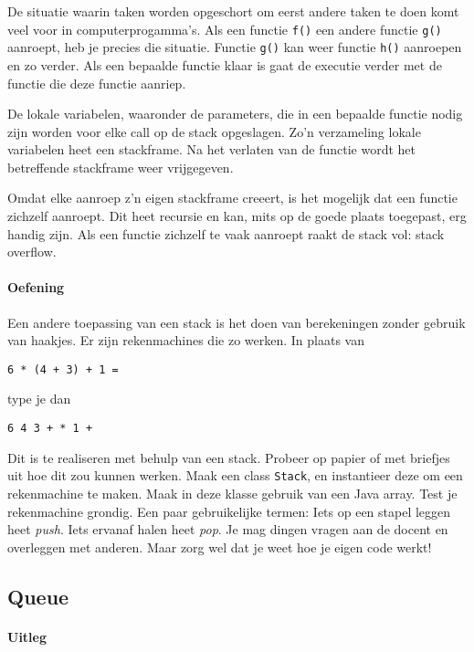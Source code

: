 \documentclass[a4paper,10pt]{article}
\newcommand{\code}[1]{\texttt{#1}}
\begin{document}
De situatie waarin taken worden opgeschort om eerst andere taken te doen komt veel voor in computerprogamma's.
Als een functie \code{f()} een andere functie \code{g()} aanroept, heb je precies die situatie.
Functie \code{g()} kan weer functie \code{h()} aanroepen en zo verder.
Als een bepaalde functie klaar is gaat de executie verder met de functie die deze functie aanriep.

De lokale variabelen, waaronder de parameters, die in een bepaalde functie nodig zijn worden voor elke call op de stack opgeslagen.
Zo'n verzameling lokale variabelen heet een stackframe.
Na het verlaten van de functie wordt het betreffende stackframe weer vrijgegeven.

Omdat elke aanroep z'n eigen stackframe creeert, is het mogelijk dat een functie zichzelf aanroept.
Dit heet recursie en kan, mits op de goede plaats toegepast, erg handig zijn.
Als een functie zichzelf te vaak aanroept raakt de stack vol: stack overflow.

\paragraph{Oefening}

Een andere toepassing van een stack is het doen van berekeningen zonder gebruik van haakjes.
Er zijn rekenmachines die zo werken.
In plaats van
\begin{verbatim}
6 * (4 + 3) + 1 =
\end{verbatim}
type je dan
\begin{verbatim}
6 4 3 + * 1 +
\end{verbatim}
Dit is te realiseren met behulp van een stack.
Probeer op papier of met briefjes uit hoe dit zou kunnen werken.
Maak een class \code{Stack}, en instantieer deze om een rekenmachine te maken.
Maak in deze klasse gebruik van een Java array.
Test je rekenmachine grondig.
Een paar gebruikelijke termen: Iets op een stapel leggen heet \emph{push}.
Iets ervanaf halen heet \emph{pop}.
Je mag dingen vragen aan de docent en overleggen met anderen.
Maar zorg wel dat je weet hoe je eigen code werkt!

\subsection*{Queue}

\paragraph{Uitleg}
\end{document}
